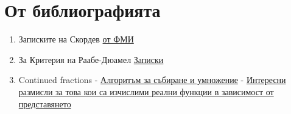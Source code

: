 \section{От библиографията}
\begin{enumerate}
      \item Записките на Скордев
            \subitem \href{https://store.fmi.uni-sofia.bg/fmi/logic/skordev/ln/cia/}{от ФМИ}
      \item За Критерия на Раабе-Дюамел
            \subitem \href{https://mariyavouniversitymaths.files.wordpress.com/2018/01/d0b8d0b7d181d0bbd0b5d0b4d0b2d0b0d0bdd0b5-d0b7d0b0-d181d185d0bed0b4d0b8d0bcd0bed181d182-d0bdd0b0-d180d0b5d0b4d0bed0b2d0b5-d181-d0bad18021.pdf}{Записки}
      \item Continued fractions
            \subitem {}\cite{gosper2003continued} - \href{https://perl.plover.com/classes/cftalk/INFO/}{Алгоритъм за събиране и умножение}
            \subitem {}\cite{gosper1977continued}
            \subitem {}\cite{ko1986continued} - \href{https://pdf.sciencedirectassets.com/271538/1-s2.0-S0304397500X05154/1-s2.0-0304397586901544/main.pdf?X-Amz-Security-Token=IQoJb3JpZ2luX2VjEDYaCXVzLWVhc3QtMSJIMEYCIQDnZ1BG84lWiYnPpw32BfoZymIqFR2CMhX8fuTAP5ycsgIhAIWbfOf0UkOFmhknCnTBu3zudZs07G4cNOp36lGhP5dKKrsFCL%2F%2F%2F%2F%2F%2F%2F%2F%2F%2F%2FwEQBRoMMDU5MDAzNTQ2ODY1IgzzLkUhppCOjlIoC6kqjwUjdWdydxBUkh8OudXPhHmtcsg4rCLB1s8Z8uYL81TmHUYXuPYQJWtaZ%2FBzkMmU4ZKkdF5SQZjNovUYacc9j2rx%2BvlgbgUcdZNTGrXxbfraceF1y6Dv8zi2SwNN7V9mMfRYtBPTxGnSwTKpcgeBfQd5ZsxYUPHHCiKlpkBKpZkhiBBY%2Ftyu6H9acCH0435UMU5NcWWwyKj%2F6bEP30L5nYYgyVRG0wz%2BivC4Ak6%2FxIEjmFGrUVR9i5MfLjL0RRGLxfSLH5ecuH60fn0r3p4vlZsaShoAg%2Bj%2B3IfxWiMp72SP3w6Ox7Wf6kgUoL%2Bj8lmB6OsgN5oBa%2B26g2oPtHFY2k10qmVQAxzmlnEMOpO%2FSXN4T58G39IKbd9QKVonZnRq6XQxr411UE8Y3PrVMfVZqT0L%2FqZwPRr2WemA8zA61oKK2F%2B%2Bqy2nFlcCVGkxkzN6SRb6iekwXAxqo83nGourlivkNk9oHXApydNEJ6HiLAxINf6ZFr34%2F3%2BWErVXipropV1mjmaUA0M6ly8zzw%2F4q%2FbeB4EejBMPzYoM95DbVVFxhQ69ZYzsajMgCpjI3Lc3zGrvFZM0uD3KLz94GakZKrhslcxa0CZTFAt8D5Mu58ysGLTWCpEmyX6VKnEhsc9dLWkjpcYDAZPYGwLs1R4HhPKE1r8vTo%2FO4Y4lrjbXcewRQHY5YYefYCeVoij5ijDM1zsIRAE22WYgZieaDR1s71mFz%2FOZP4b1lAjx34vcHm5xDeZOqPEIVUXKwjemp1xOvlDN4lW6DvdwavdUmWhm2j9QHgbCtYcZxWMcP6F14nOCRQR2%2Bv4lWMNWdAF5YilPzDy9JlkTrzzyMmsldujClgi7ZeeHicDmCEusRD%2FqAwR%2FMI7YgbMGOrABMhi15q9YyykxI6C5k6Q5EGvJpy0M0TBR017ArL8gpTmnAiA5ULXVl90B9XtqZcaGU07bmTh8zbNqIt5oN3GcYv0DAa09qtefaVTcYznZYJeBj3mhq3tgIIzN%2FJdCvw18vusISdTYBR9XFU863JMjMB8o%2F593QswJBKlvronJViiEP0teUQ4D2UeXqCK7w3Z3jtGDrLccWeorI5d7X5SOzEVLdv5F6lv%2BxCftnclmUNo%3D&X-Amz-Algorithm=AWS4-HMAC-SHA256&X-Amz-Date=20240605T150915Z&X-Amz-SignedHeaders=host&X-Amz-Expires=300&X-Amz-Credential=ASIAQ3PHCVTY5KNCYMQT%2F20240605%2Fus-east-1%2Fs3%2Faws4_request&X-Amz-Signature=b901cea7d0f6ae41e6f3ae3385d1347ac74b87ce9413e7d05e9e6f6c8e4a7bd5&hash=289fe555acbd4a61d63f9a4f336c8320ca4ce2458d71d8326cdba177a405ca70&host=68042c943591013ac2b2430a89b270f6af2c76d8dfd086a07176afe7c76c2c61&pii=0304397586901544&tid=spdf-1f16e1e4-b021-4cc1-9a6e-2b6f8af6cd80&sid=010b1c125d3d694dfb98344814179934ce53gxrqb&type=client&tsoh=d3d3LnNjaWVuY2VkaXJlY3QuY29t&ua=06005e5904565e5a5c&rr=88f1152abe42f8b5&cc=bg}{Интересни размисли за това кои са изчислими реални функции в зависимост от представянето}
\end{enumerate}
\nocite{*}

\printbibliography